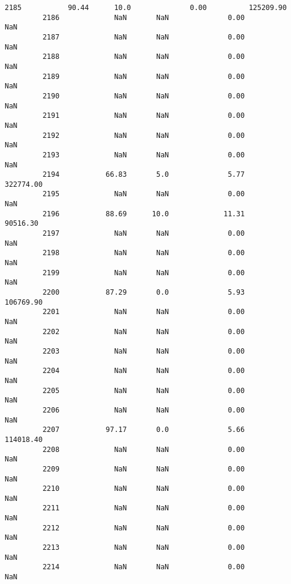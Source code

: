\documentclass[11pt]{llncs}
\begin{document}
\begin{Verbatim}[commandchars=\\\{\}]
         2185           90.44      10.0              0.00          125209.90   
         2186             NaN       NaN              0.00                NaN   
         2187             NaN       NaN              0.00                NaN   
         2188             NaN       NaN              0.00                NaN   
         2189             NaN       NaN              0.00                NaN   
         2190             NaN       NaN              0.00                NaN   
         2191             NaN       NaN              0.00                NaN   
         2192             NaN       NaN              0.00                NaN   
         2193             NaN       NaN              0.00                NaN   
         2194           66.83       5.0              5.77          322774.00   
         2195             NaN       NaN              0.00                NaN   
         2196           88.69      10.0             11.31           90516.30   
         2197             NaN       NaN              0.00                NaN   
         2198             NaN       NaN              0.00                NaN   
         2199             NaN       NaN              0.00                NaN   
         2200           87.29       0.0              5.93          106769.90   
         2201             NaN       NaN              0.00                NaN   
         2202             NaN       NaN              0.00                NaN   
         2203             NaN       NaN              0.00                NaN   
         2204             NaN       NaN              0.00                NaN   
         2205             NaN       NaN              0.00                NaN   
         2206             NaN       NaN              0.00                NaN   
         2207           97.17       0.0              5.66          114018.40   
         2208             NaN       NaN              0.00                NaN   
         2209             NaN       NaN              0.00                NaN   
         2210             NaN       NaN              0.00                NaN   
         2211             NaN       NaN              0.00                NaN   
         2212             NaN       NaN              0.00                NaN   
         2213             NaN       NaN              0.00                NaN   
         2214             NaN       NaN              0.00                NaN   
         

\end{Verbatim}
\end{document}
